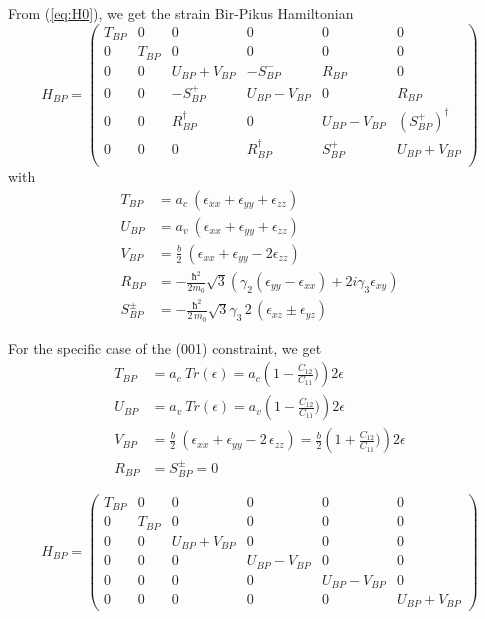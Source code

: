 \documentclass[prb,aps]{revtex4}
\begin{document}
		From (\ref{eq:H0}), we get the strain Bir-Pikus Hamiltonian
		\begin{equation}
			\label{eq:H-BP}
			H_{BP}=
			\begin{pmatrix}
				T_{BP} & 0 & 0 &0 &0 &0     \\
				0 & T_{BP} & 0 & 0 &0 &0   \\
				0 & 0 & U_{BP}+V_{BP} & -S^-_{BP} & R_{BP} & 0  \\
				0 & 0 & - S_{BP}^+ & U_{BP}-V_{BP} & 0& R_{BP} \\
				0& 0 & R_{BP}^\dagger & 0 & U_{BP}-V_{BP} & (S_{BP}^+)^\dagger \\
				0 & 0 & 0 & R_{BP}^\dagger & S_{BP}^+ & U_{BP}+V_{BP}  \\
			\end{pmatrix}
		\end{equation}
		with
		\begin{align}
			T_{BP} &=  a_c~ \left(  ϵ_{xx} + ϵ_{yy} + ϵ_{zz}  \right)  \\
			U_{BP} &= a_v~ \left(  ϵ_{xx} + ϵ_{yy} + ϵ_{zz}  \right)   \\
			V_{BP} &= \frac{b}{2}~ \left(  ϵ_{xx} + ϵ_{yy} -2  ϵ_{zz}  \right)  \\
			R_{BP} &= - \frac{ħ^2 }{2m_0} \sqrt{3} \left( γ_2( ϵ_{yy} - ϵ_{xx}) + 2 i γ_3  ϵ_{xy} \right) \\
			S^\pm_{BP} &= - \frac{ħ^2 }{2\,m_0} \sqrt{3} γ_3\,2\,(ϵ_{xz} \pm ϵ_{yz} )
		\end{align}

		For the specific case of the (001) constraint, we get
		\begin{align}
			T_{BP} &= a_c~ Tr(ϵ) = a_c \left( 1-\frac{C_{12}}{C_{11}}) \right) 2 ϵ  \\
			U_{BP} &= a_v~ Tr(ϵ) = a_v \left( 1-\frac{C_{12}}{C_{11}}) \right) 2 ϵ    \\
			V_{BP} &= \frac{b}{2}~ \left( ϵ_{xx} + ϵ_{yy} - 2\,ϵ_{zz} \right) = \frac{b}{2}   \left( 1+\frac{C_{12}}{C_{11}})   \right) 2 ϵ   \\
			R_{BP} &= S^\pm_{BP} =0
		\end{align}

		\begin{equation}
			\label{eq:H-BP2}
			H_{BP}=
			\begin{pmatrix}
				T_{BP} & 0 & 0 &0 &0 &0     \\
				0 & T_{BP} & 0 & 0 &0 &0   \\
				0 & 0 & U_{BP}+V_{BP} & 0& 0 & 0  \\
				0 & 0 &0 & U_{BP}-V_{BP} & 0 & 0  \\
				0& 0 & 0& 0 & U_{BP}-V_{BP} &0 \\
				0 & 0 & 0 & 0 & 0 & U_{BP}+V_{BP}
			\end{pmatrix}
		\end{equation}
\end{document}
